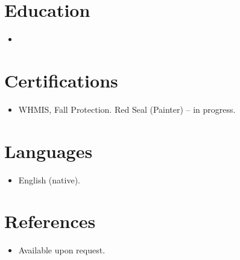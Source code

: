 \documentclass[11pt,letterpaper,sans]{moderncv}
\begin{document}

\section{Education}
\vspace{1pt}
\begin{itemize}
\item{}
\end{itemize}


\section{Certifications}
\vspace{1pt}
\begin{itemize}
\item WHMIS, Fall Protection. Red Seal (Painter) -- in progress.
\end{itemize}


\section{Languages}
\vspace{1pt}
\begin{itemize}
\item English (native).
\end{itemize}


\section{References}
\vspace{1pt}
\begin{itemize}
\item{Available upon request.}
\end{itemize}
\end{document}
